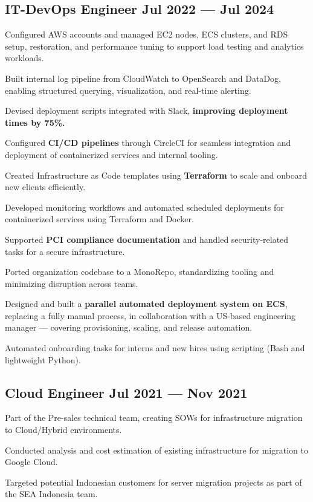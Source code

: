 \subsection{\texorpdfstring{IT-DevOps Engineer \hfill Jul 2022 --- Jul 2024}{IT-DevOps Engineer, Jul 2022 -- Jul 2024}}
\begin{zitemize}
\item Configured AWS accounts and managed EC2 nodes, ECS clusters, and RDS setup, restoration, and performance tuning to support load testing and analytics workloads.
\item Built internal log pipeline from CloudWatch to OpenSearch and DataDog, enabling structured querying, visualization, and real-time alerting.
\item Devised deployment scripts integrated with Slack, \textbf{improving deployment times by 75\%.}
\item Configured \textbf{CI/CD pipelines} through CircleCI for seamless integration and deployment of containerized services and internal tooling.
\item Created Infrastructure as Code templates using \textbf{Terraform} to scale and onboard new clients efficiently.
\item Developed monitoring workflows and automated scheduled deployments for containerized services using Terraform and Docker.
\item Supported \textbf{PCI compliance documentation} and handled security-related tasks for a secure infrastructure.
\item Ported organization codebase to a MonoRepo, standardizing tooling and minimizing disruption across teams.
\item Designed and built a \textbf{parallel automated deployment system on ECS}, replacing a fully manual process, in collaboration with a US-based engineering manager — covering provisioning, scaling, and release automation.
\item Automated onboarding tasks for interns and new hires using scripting (Bash and lightweight Python).
\end{zitemize}


\subsection{\texorpdfstring{Cloud Engineer \hfill Jul 2021 --- Nov 2021}{Cloud Engineer, Jul 2021 -- Nov 2021}}
\begin{zitemize}
\item Part of the Pre-sales technical team, creating SOWs for infrastructure migration to Cloud/Hybrid environments.
\item Conducted analysis and cost estimation of existing infrastructure for migration to Google Cloud.
\item Targeted potential Indonesian customers for server migration projects as part of the SEA Indonesia team.
\end{zitemize}
